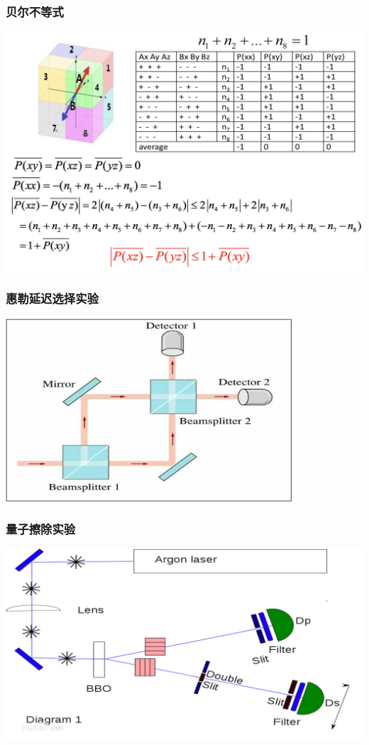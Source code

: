 \begin{frame}
    \frametitle{贝尔不等式}
    \begin{center}
        \includegraphics[width=1.0\textwidth]{figs/bell.png} \\
    \end{center} 
\end{frame}

\begin{frame}
    \frametitle{惠勒延迟选择实验}
    \begin{center}
        \includegraphics[width=0.8\textwidth]{figs/choose.png} \\
    \end{center} 
\end{frame}

\begin{frame}
    \frametitle{量子擦除实验}
    \begin{center}
        \includegraphics[width=1.0\textwidth]{figs/chachuexp.png} \\
    \end{center} 
\end{frame}

